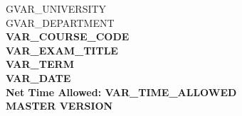\thispagestyle{empty}

\begin{center}
    \begin{large}
        GVAR_UNIVERSITY\\ %
        GVAR_DEPARTMENT\\ %
        {\bf VAR_COURSE_CODE}  \\
        {\bf VAR_EXAM_TITLE}  \\
        {\bf VAR_TERM}  \\
        {\bf VAR_DATE }  \\ %
        {\bf Net Time Allowed: VAR_TIME_ALLOWED}  \\
        \vspace*{6cm}
        {\bf {\Huge{MASTER VERSION}}}  \\
    \end{large}
\end{center}


